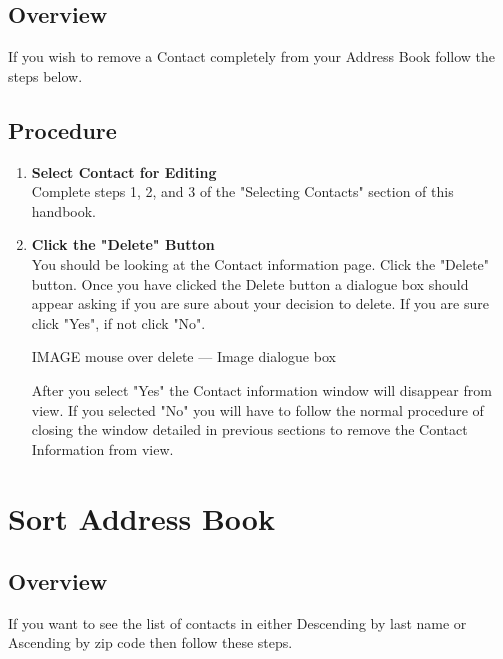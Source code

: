 \documentclass[a4paper, 11pt]{article}
\begin{document}
\subsection{Overview}
If you wish to remove a Contact completely from your Address Book follow the steps below.
\subsection{Procedure}
\begin{enumerate}[label=\textbf{\arabic*})]
    \item{\textbf{Select Contact for Editing}}\\ Complete steps 1, 2, and 3 of the "Selecting Contacts" section of this handbook. 
    
    \item{\textbf{Click the "Delete" Button}}\\ You should be looking at the Contact information page. Click the "Delete" button. Once you have clicked the Delete button a dialogue box should appear asking if you are sure about your decision to delete. If you are sure click "Yes", if not click "No".
    
    IMAGE mouse over delete --- Image dialogue box
    
    After you select "Yes" the Contact information window will disappear from view. If you selected "No" you will have to follow the normal procedure of closing the window detailed in previous sections to remove the Contact Information from view.  
\end{enumerate}


\section{Sort Address Book}
\subsection{Overview}
If you want to see the list of contacts in either Descending by last name or Ascending by zip code then follow these steps. 
\end{document}
